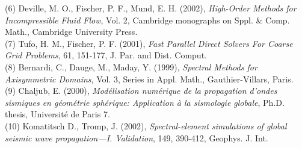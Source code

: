 \documentclass[11pt,letter,fleqn,english,notitlepage]{article}
\begin{document}
(6) Deville, M. O., Fischer, P. F., Mund, E. H. (2002), 
\textit{High-Order Methods for Incompressible Fluid Flow}, 
Vol. 2, Cambridge monographs on Sppl. \& Comp. Math., Cambridge University Press.\\

(7) Tufo, H. M., Fischer, P. F. (2001), \textit{Fast Parallel Direct Solvers For Coarse Grid Problems}, 
61, 151-177, J. Par. and Dist. Comput.\\

(8) Bernardi, C., Dauge, M., Maday, Y. (1999), \textit{Spectral Methods for Axisymmetric Domains}, 
Vol. 3, Series in Appl. Math., Gauthier-Villars, Paris.\\

(9) Chaljub, E. (2000), \textit{Mod{\'{e}}lisation num{\'{e}}rique de la 
propagation d'ondes sismiques en g{\'{e}}om{\'{e}}trie sph{\'{e}}rique:
Application {\`{a}} la sismologie globale}, 
Ph.D. thesis, Universit{\'{e}} de Paris 7.\\

(10) Komatitsch D., Tromp, J. (2002), \textit{Spectral-element simulations of
global seismic wave propagation---I. Validation},
149, 390-412, Geophys. J. Int.
\end{document}
